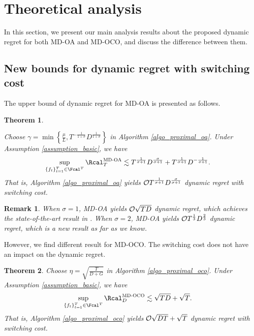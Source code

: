 \documentclass[journal]{IEEEtran}
\newtheorem{Theorem}{\bf{Theorem}}
\newtheorem{Remark}{\bf{Remark}}
\begin{document}
\section{Theoretical analysis}
\label{sect_theoretical_analysis}
In this section, we present our main analysis results about the proposed dynamic regret for both MD-OA and MD-OCO, and discuss the difference between them. 

\subsection{New bounds for dynamic regret with switching cost}

The upper bound of dynamic regret for MD-OA is presented as follows.

\begin{Theorem}
\label{theorem_regret_oa_upper_bound}

Choose $\gamma  = \min \left\{ \frac{\mu}{L}, T^{-\frac{1}{1+\sigma}} D^{\frac{1}{1+\sigma}} \right\}$ in Algorithm \ref{algo_proximal_oa}. Under Assumption \ref{assumption_basic}, we have 
\begin{align}
\nonumber
\sup_{\{f_t\}_{t=1}^T \in \Fcal^T}\Rcal_T^{\textsc{MD-OA}}\lesssim T^{\frac{1}{\sigma+1}}D^{\frac{\sigma}{\sigma+1}} + T^{\frac{1}{\sigma+1}} D^{-\frac{1}{\sigma+1}}.
\end{align} That is,  Algorithm \ref{algo_proximal_oa} yields ${\mathcal{O}}{T^{\frac{1}{\sigma+1}}D^{\frac{\sigma}{\sigma+1}}}$ dynamic regret with switching cost.

\end{Theorem}


\begin{Remark}
When $\sigma = 1$, MD-OA yields ${\mathcal{O}}{\sqrt{TD}}$ dynamic regret, which achieves the state-of-the-art result in \cite{pmlr-v75-chen18b}. When $\sigma = 2$, MD-OA yields ${\mathcal{O}}{T^{\frac{1}{3}}D^{\frac{2}{3}}}$ dynamic regret, which is a new result as far as we know.
\end{Remark}


However, we find different result for MD-OCO. The switching cost does not have an impact on the dynamic regret. 

\begin{Theorem}
\label{theorem_regret_oco_upper_bound}
Choose $\eta = \sqrt{\frac{T}{D+G}}$ in Algorithm \ref{algo_proximal_oco}. Under Assumption \ref{assumption_basic}, we have
\begin{align}
\nonumber
\sup_{\{f_{t}\}_{t=1}^T \in \Fcal^T} \Rcal_D^{\textsc{MD-OCO}} \lesssim \sqrt{TD}  + \sqrt{T}.
\end{align} That is, Algorithm \ref{algo_proximal_oco} yields ${\mathcal{O}}{\sqrt{DT} + \sqrt{T}}$ dynamic regret with switching cost.
\end{Theorem} 
\end{document}
